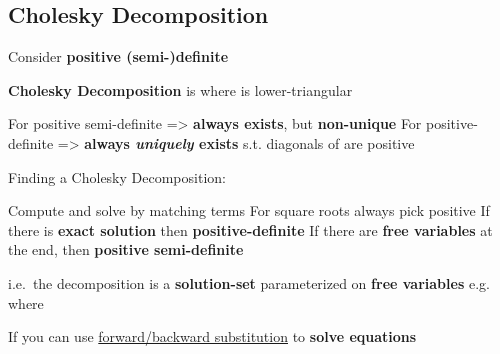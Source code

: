 \subsection*{Cholesky Decomposition}


Consider \textbf{positive (semi-)definite}

\textbf{Cholesky Decomposition} is  where 
is lower-triangular
\begin{itemize}

      \vItem
            For positive semi-definite => \textbf{always exists},
            but \textbf{non-unique}
      \vItem
            For positive-definite => \textbf{always \emph{uniquely}
                  exists} s.t. diagonals of  are positive
\end{itemize}

\hSep %

Finding a Cholesky Decomposition:
\begin{itemize}

      \vItem
            Compute  and solve  by matching terms
      \vItem
            For square roots always pick positive
      \vItem
            If there is \textbf{exact solution} then \textbf{positive-definite}
      \vItem
            If there are \textbf{free variables} at the end, then
            \textbf{positive semi-definite}

            \begin{itemize}

                  \vItem
                        i.e.~the decomposition is a \textbf{solution-set} parameterized on
                        \textbf{free variables}
                  \vItem
                        e.g.~
                        where
            \end{itemize}
\end{itemize}

\hSep %

If  you can use \underline{forward/backward substitution} to
\textbf{solve equations}

